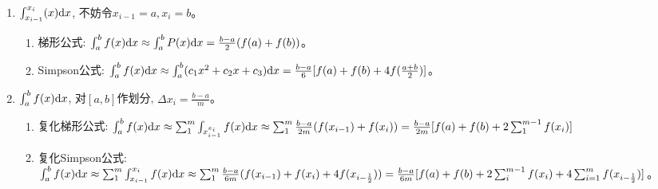 \begin{enumerate}
    \item $\int_{x_{i-1}}^{x_i} (x) \mathrm{d} x$, 不妨令$x_{i-1} = a, x_i = b$。
    \begin{enumerate}
        \item 梯形公式: $\int_a^b f(x) \mathrm{d} x \approx \int_a^b P(x) \mathrm{d} x = \frac{b-a}{2}(f(a) + f(b))$。
        \item Simpson公式: $\int_a^b f(x) \mathrm{d} x \approx \int_a^b (c_1x^2+c_2x+c_3) \mathrm{d} x = \frac{b-a}{6}[f(a) + f(b) + 4f(\frac{a+b}{2})]$。
    \end{enumerate}
    \item $\int_a^b f(x) \mathrm{d} x$, 对$[a, b]$作划分, $\Delta x_i = \frac{b-a}{m}$。
    \begin{enumerate}
        \item 复化梯形公式: $\int_a^b f(x) \mathrm{d} x \approx \sum_1^m \int_{x_{i-1}^{x_i}} f(x) \mathrm{d} x \approx \sum_1^m \frac{b-a}{2m}(f(x_{i-1}) + f(x_i)) = \frac{b-a}{2m} [f(a) + f(b) + 2\sum_1^{m-1} f(x_i)]$
        \item 复化Simpson公式: $\int_a^b f(x) \mathrm{d} x \approx \sum_1^m \int_{x_{i-1}}^{x_i} f(x) \mathrm{d} x \approx \sum_1^m \frac{b-a}{6m}(f(x_{i-1})+f(x_i)+4f(x_{i-\frac{1}{2}})) = \frac{b-a}{6m}[f(a)+ f(b) + 2\sum_i^{m-1} f(x_i) + 4\sum_{i = 1}^m f(x_{i-\frac{1}{2}})]$。
    \end{enumerate}
\end{enumerate}